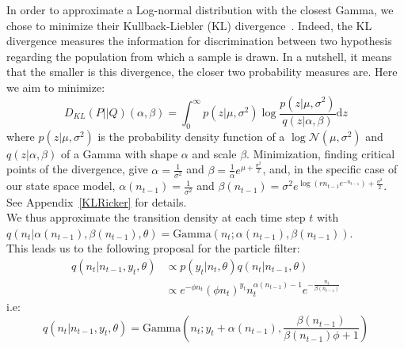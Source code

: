 \documentclass[12pt]{article}
\begin{document}
	In order to approximate a Log-normal distribution with the closest Gamma, we chose to minimize their Kullback-Liebler (KL) divergence~\cite{kullback1951information}. Indeed, the KL divergence measures the information for discrimination between two hypothesis regarding the population from which a sample is drawn. In a nutshell, it means that the smaller is this divergence, the closer two probability measures are. Here we aim to minimize:
	\begin{equation}
	D_{KL}(P||Q)(\alpha, \beta) = \int_{0}^{\infty}{p(z|\mu, \sigma^2)\log\frac{p(z|\mu, \sigma^2)}{q(z|\alpha, \beta)}\mathrm{d}z}
	\end{equation}
	where $p(z|\mu, \sigma^2)$ is the probability density function of a $\log\mathcal{N}(\mu, \sigma^2)$ and $q(z|\alpha, \beta)$ of a Gamma with shape $\alpha$ and scale $\beta$. Minimization, finding critical points of the divergence, give $\alpha =\frac{1}{\sigma^2}$ and $\beta=\frac{1}{\alpha}e^{\mu+\frac{\sigma^2}{2}}$, and, in the specific case of our state space model, $\alpha(n_{t-1})= \frac{1}{\sigma^2}$ and $\beta(n_{t-1})=\sigma^2e^{\log(rn_{t-1}e^{-n_{t-1}})+\frac{\sigma^2}{2}}$. See Appendix~\ref{KLRicker} for details. \\
	We thus approximate the transition density at each time step $t$ with $q(n_t|\alpha(n_{t-1}), \beta(n_{t-1}), \theta) = \mathrm{Gamma}(n_t ; \alpha(n_{t-1}), \beta(n_{t-1}) )$. \\
	This leads us to the following proposal for the particle filter:
	\begin{equation*}
	\begin{split}
	q(n_t|n_{t-1}, y_t, \theta) & \propto  p(y_t|n_t, \theta)q(n_t|n_{t-1}, \theta) \\
	& \propto e^{-\phi n_t}(\phi n_t)^{y_t}n_t^{\alpha(n_{t-1})-1}e^{-\frac{n_t}{\beta(n_{t-1})}}
	\end{split}
	\end{equation*}
	i.e:
	\begin{equation*}
	q(n_t|n_{t-1}, y_t, \theta) = \mathrm{Gamma}(n_t ; y_t+\alpha(n_{t-1}), \frac{\beta(n_{t-1})}{\beta(n_{t-1})\phi + 1})\end{equation*}
	
\end{document}
